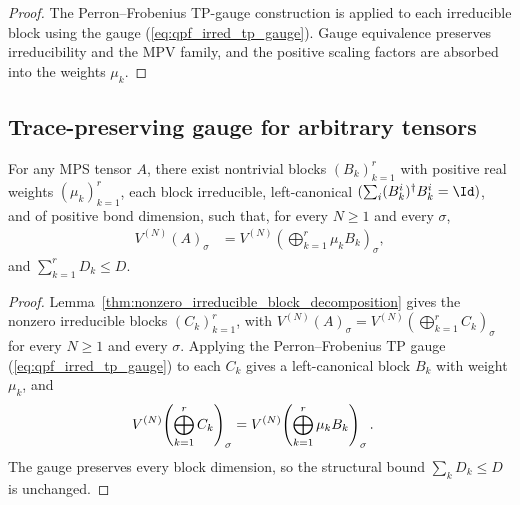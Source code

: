 \begin{proof}\leanok
    The Perron--Frobenius TP-gauge construction is applied to each irreducible
    block using the gauge (\ref{eq:qpf_irred_tp_gauge}). Gauge equivalence
    preserves irreducibility and the MPV family, and the positive scaling
    factors are absorbed into the weights $\mu_k$.
\end{proof}

\subsection{Trace-preserving gauge for arbitrary tensors}%
\label{sec:tp_gauge_arbitrary}

\begin{lemma}%
    \label{thm:tp_gauge_arbitrary}
    \leanok
    For any MPS tensor $A$, there exist nontrivial blocks
    $(B_k)_{k=1}^r$ with positive real weights $(\mu_k)_{k=1}^r$,
    each block irreducible, left-canonical
    $(\sum_i(B_k^i)^\dagger B_k^i=\Id)$, and of positive bond dimension, such
    that, for every $N\ge1$ and every $\sigma$,
    \begin{align}
        V^{(N)}(A)_\sigma
         & =
        V^{(N)}\!\left(\bigoplus_{k=1}^r\mu_kB_k\right)_\sigma,
        \label{eq:canonical_arbitrary_tp}
    \end{align}
    and $\sum_{k=1}^rD_k\le D$.
\end{lemma}

\begin{proof}\leanok
    Lemma~\ref{thm:nonzero_irreducible_block_decomposition} gives the
    nonzero irreducible blocks $(C_k)_{k=1}^r$, with
    $V^{(N)}(A)_\sigma
        =V^{(N)}(\bigoplus_{k=1}^rC_k)_\sigma$ for every $N\ge1$ and every
    $\sigma$. Applying the Perron--Frobenius TP gauge
    (\ref{eq:qpf_irred_tp_gauge}) to each $C_k$ gives a left-canonical block
    $B_k$ with weight $\mu_k$, and
    \begin{align}
        V^{(N)}\!\left(\bigoplus_{k=1}^rC_k\right)_\sigma
         & =
        V^{(N)}\!\left(\bigoplus_{k=1}^r\mu_kB_k\right)_\sigma.
        \notag
    \end{align}
    The gauge preserves every block dimension, so the structural bound
    $\sum_kD_k\le D$ is unchanged.
\end{proof}

